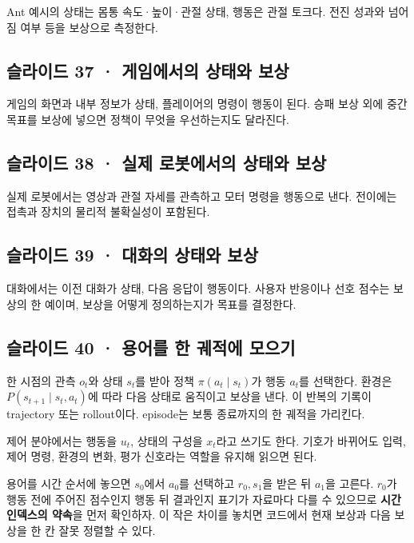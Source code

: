 \documentclass[11pt,a4paper]{article}
\begin{document}
Ant 예시의 상태는 몸통 속도·높이·관절 상태, 행동은 관절 토크다. 전진 성과와 넘어짐 여부 등을 보상으로 측정한다.\par

\subsection{슬라이드 37 · 게임에서의 상태와 보상}

게임의 화면과 내부 정보가 상태, 플레이어의 명령이 행동이 된다. 승패 보상 외에 중간 목표를 보상에 넣으면 정책이 무엇을 우선하는지도 달라진다.\par

\subsection{슬라이드 38 · 실제 로봇에서의 상태와 보상}

실제 로봇에서는 영상과 관절 자세를 관측하고 모터 명령을 행동으로 낸다. 전이에는 접촉과 장치의 물리적 불확실성이 포함된다.\par

\subsection{슬라이드 39 · 대화의 상태와 보상}

대화에서는 이전 대화가 상태, 다음 응답이 행동이다. 사용자 반응이나 선호 점수는 보상의 한 예이며, 보상을 어떻게 정의하는지가 목표를 결정한다.\par

\subsection{슬라이드 40 · 용어를 한 궤적에 모으기}

한 시점의 관측 $o_t$와 상태 $s_t$를 받아 정책 $\pi(a_t\mid s_t)$가 행동 $a_t$를 선택한다. 환경은 $P(s_{t+1}\mid s_t,a_t)$에 따라 다음 상태로 움직이고 보상을 낸다. 이 반복의 기록이 trajectory 또는 rollout이다. episode는 보통 종료까지의 한 궤적을 가리킨다.\par

제어 분야에서는 행동을 $u_t$, 상태의 구성을 $x_t$라고 쓰기도 한다. 기호가 바뀌어도 입력, 제어 명령, 환경의 변화, 평가 신호라는 역할을 유지해 읽으면 된다.\par

용어를 시간 순서에 놓으면 $s_0$에서 $a_0$를 선택하고 $r_0,s_1$을 받은 뒤 $a_1$을 고른다. $r_0$가 행동 전에 주어진 점수인지 행동 뒤 결과인지 표기가 자료마다 다를 수 있으므로 \textbf{시간 인덱스의 약속}을 먼저 확인하자. 이 작은 차이를 놓치면 코드에서 현재 보상과 다음 보상을 한 칸 잘못 정렬할 수 있다.\par
\end{document}
